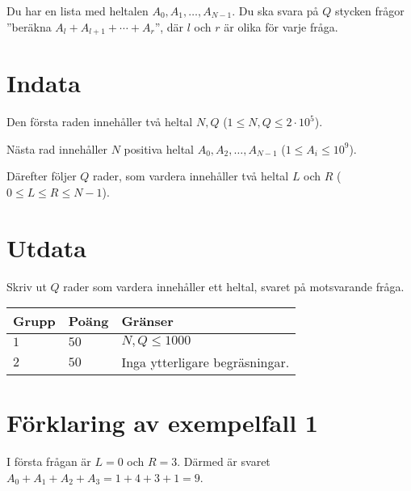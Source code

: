 Du har en lista med heltalen $A_0, A_1, \dots, A_{N-1}$.
Du ska svara på $Q$ stycken frågor ”beräkna $A_l+A_{l+1}+\cdots+A_{r}$”, där $l$ och $r$ är olika
för varje fråga. 

\section*{Indata}
Den första raden innehåller två heltal $N, Q$ ($1 \leq N, Q \leq 2 \cdot 10^5$).

Nästa rad innehåller $N$ positiva heltal $A_0, A_2, \dots, A_{N-1}$ ($1 \leq A_i \leq 10^9$).

Därefter följer $Q$ rader, som vardera innehåller två heltal $L$ och $R$ ($0 \leq L \leq R \leq N-1$).

\section*{Utdata}
Skriv ut $Q$ rader som vardera innehåller ett heltal, svaret på motsvarande fråga.


\noindent
\begin{tabular}{| l | l | p{12cm} |}
  \hline
  \textbf{Grupp} & \textbf{Poäng} & \textbf{Gränser} \\ \hline
  $1$    & $50$      & $N, Q \leq 1000$ \\ \hline
  $2$    & $50$      & Inga ytterligare begräsningar. \\ \hline
\end{tabular}

\section*{Förklaring av exempelfall 1}
I första frågan är $L=0$ och $R=3$. Därmed är svaret $A_0+A_1+A_2+A_3=1+4+3+1=9$.
